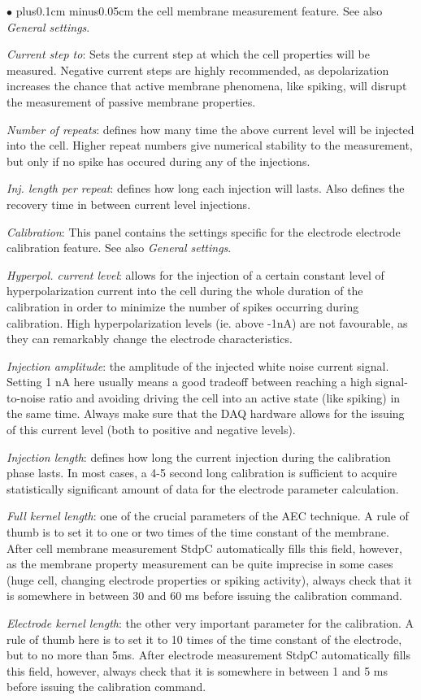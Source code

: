 \documentclass{article}
\newenvironment{myitem}{\begin{list}{$\bullet$}{\setlength{\leftmargin}{1.1em}
\itemsep0.1cm plus0.1cm minus0.05cm
\listparindent0cm
\addtolength{\labelsep}{0.5\labelsep}
\setlength{\labelwidth}{0.8em}
\setlength{\leftmargin}{\labelwidth}
\addtolength{\leftmargin}{\labelsep}
}}{\end{list}}
\begin{document}
\begin{myitem}
  the cell membrane measurement feature. See also \emph{General settings}. 
\item \emph{Current step to}: Sets the current step at which the cell
  properties will be measured. Negative current steps are highly
  recommended, as depolarization increases the chance that active membrane
  phenomena, like spiking, will disrupt the measurement of passive membrane
  properties. 
\item \emph{Number of repeats}: defines how many time the above current level
  will be injected into the cell. Higher repeat numbers give numerical
  stability to the measurement, but only if no spike has occured during any
  of the injections. 
\item \emph{Inj. length per repeat}: defines how long each injection will
  lasts. Also defines the recovery time in between current level injections. 
\item \emph{Calibration}: This panel contains the settings specific for
  the electrode electrode calibration feature. See also \emph{General
    settings}.
\item \emph{Hyperpol. current level}: allows for the injection of a certain
  constant level of  hyperpolarization current into the cell during the
  whole duration of the calibration in order to minimize the number of
  spikes occurring during calibration. High hyperpolarization levels
  (ie. above -1nA) are not favourable, as they can remarkably change the electrode 
  characteristics.
\item \emph{Injection amplitude}: the amplitude of the injected
  white noise current signal. Setting 1 nA here usually means a good
  tradeoff between reaching a high signal-to-noise ratio and avoiding
  driving the cell into 
  an active state (like spiking) in the same time. Always make sure that
  the DAQ hardware allows for the issuing of this current level (both to
  positive and negative levels).
\item \emph{Injection length}: defines how long the current injection during
  the calibration phase lasts. In most cases, a 4-5 second long calibration
  is sufficient to acquire statistically significant amount of data for the
  electrode parameter calculation.   
\item \emph{Full kernel length}: one of the crucial parameters of the AEC
  technique. A rule of thumb is to set it to one or two times of the time constant of
  the membrane. After cell membrane measurement StdpC automatically
  fills this field, however, as the membrane property measurement can be
  quite imprecise in some cases (huge cell, changing electrode properties
  or spiking activity), always check that it is somewhere in between 30 and
  60 ms before issuing the calibration command.
\item \emph{Electrode kernel length}: the other very important parameter for
  the calibration. A rule of thumb here is to set it to 10 times of the
  time constant of the electrode, but to no more than 5ms. After electrode
  measurement StdpC automatically fills this field, however, always
  check that it is somewhere in between 1 and 5 ms before issuing the
  calibration command.
\end{myitem}
\end{document}
